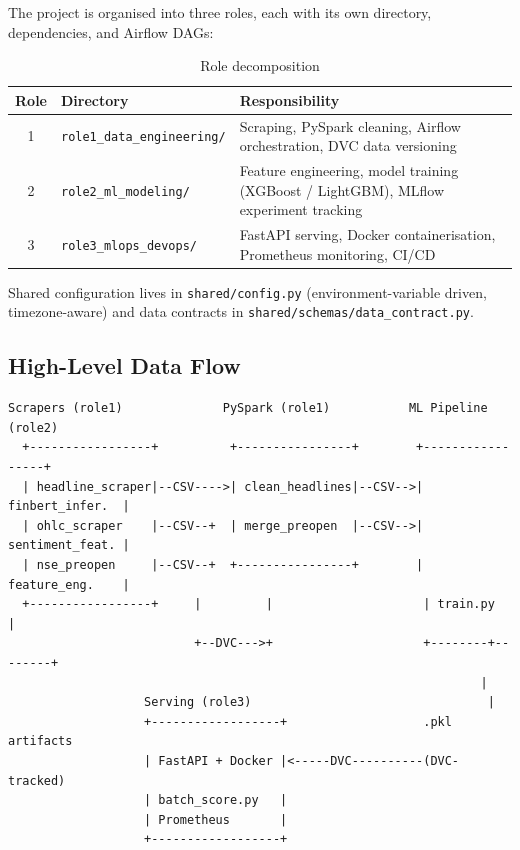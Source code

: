\documentclass[11pt,a4paper]{article}
\begin{document}
The project is organised into three roles, each with its own directory,
dependencies, and Airflow DAGs:

\begin{table}[H]
\centering
\caption{Role decomposition}
\begin{tabular}{@{}clp{7.5cm}@{}}
\toprule
\textbf{Role} & \textbf{Directory} & \textbf{Responsibility} \\
\midrule
1 & \texttt{role1\_data\_engineering/} & Scraping, PySpark cleaning, Airflow
  orchestration, DVC data versioning \\
2 & \texttt{role2\_ml\_modeling/}      & Feature engineering, model training
  (XGBoost / LightGBM), MLflow experiment tracking \\
3 & \texttt{role3\_mlops\_devops/}     & FastAPI serving, Docker containerisation,
  Prometheus monitoring, CI/CD \\
\bottomrule
\end{tabular}
\end{table}

Shared configuration lives in \texttt{shared/config.py} (environment-variable
driven, timezone-aware) and data contracts in
\texttt{shared/schemas/data\_contract.py}.

\subsection{High-Level Data Flow}

\begin{lstlisting}[style=ascii, caption={End-to-end data flow}]
  Scrapers (role1)              PySpark (role1)           ML Pipeline (role2)
  +-----------------+          +----------------+        +-----------------+
  | headline_scraper|--CSV---->| clean_headlines|--CSV-->| finbert_infer.  |
  | ohlc_scraper    |--CSV--+  | merge_preopen  |--CSV-->| sentiment_feat. |
  | nse_preopen     |--CSV--+  +----------------+        | feature_eng.    |
  +-----------------+     |         |                     | train.py        |
                          +--DVC--->+                     +--------+--------+
                                                                  |
                   Serving (role3)                                 |
                   +------------------+                   .pkl artifacts
                   | FastAPI + Docker |<-----DVC----------(DVC-tracked)
                   | batch_score.py   |
                   | Prometheus       |
                   +------------------+
\end{lstlisting}
\end{document}
